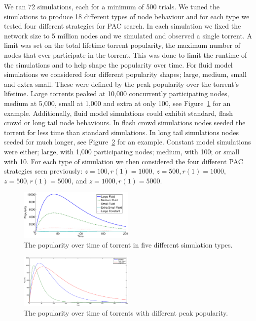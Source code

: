     We ran 72 simulations, each for a minimum of 500 trials. We tuned the simulations to produce 18 different types of node behaviour and for each type we tested four different strategies for PAC search. In each simulation we fixed the network size to 5 million nodes and we simulated and observed a single torrent. A limit was set on the total lifetime torrent popularity, the maximum number of nodes that ever participate in the torrent. This was done to limit the runtime of the simulations and to help shape the popularity over time. For fluid model simulations we considered four different popularity shapes; large, medium, small and extra small. These were defined by the peak popularity over the torrent's lifetime. Large torrents peaked at 10,000 concurrently participating nodes, medium at 5,000, small at 1,000 and extra at only 100, see Figure~\ref{fig:types} for an example. Additionally, fluid model simulations could exhibit standard, flash crowd or long tail node behaviours. In flash crowd simulations nodes seeded the torrent for less time than standard simulations. In long tail simulations nodes seeded for much longer, see Figure~\ref{fig:scales} for an example. Constant model simulations were either; large, with 1,000 participating nodes; medium, with 100; or small with 10. For each type of simulation we then considered the four different PAC strategies seen previously: $z=100, r(1)=1000$, $z=500, r(1)=1000$, $z=500, r(1)=5000$, and $z=1000, r(1)=5000$.

    \begin{figure}[t]
        \centering
        \includegraphics[width=0.5\textwidth]{Images/SimulatedPopularitiesTypes.eps}
        \caption[Popularity over time in five simulation types]{The popularity over time of torrent in five different simulation types.}
        \label{fig:types}
    \end{figure}

    \begin{figure}[t]
        \centering
        \includegraphics[width=0.5\textwidth]{Images/SimulatedPopularitiesScales.eps}
        \caption[Popularity over time for different scales]{The popularity over time of torrents with different peak popularity.}
        \label{fig:scales}
    \end{figure}

